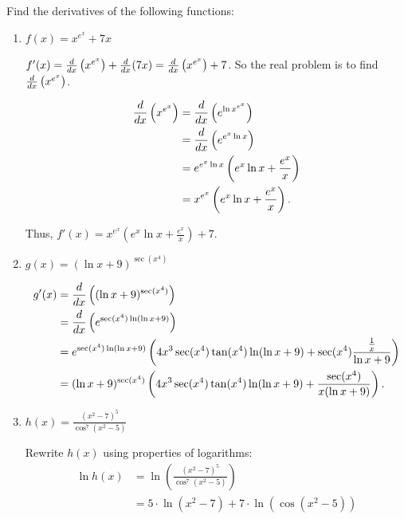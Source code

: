 \documentclass[nooutcomes]{ximera}
\begin{document}
\begin{problem}
Find the derivatives of the following functions:
	\begin{enumerate}
	
	\item  $f(x) = x^{e^x} + 7x$
		\begin{freeResponse}
		$f'(x) = \frac{d}{dx} \left(x^{e^x} \right) + \frac{d}{dx}(7x) = \frac{d}{dx} \left(x^{e^x} \right) + 7$.  So the real problem is to find $\frac{d}{dx} \left(x^{e^x} \right)$.  
		
		\begin{align*}
		\frac{d}{dx} \left( x^{e^x} \right) &= \frac{d}{dx} \left( e^{\ln x^{e^x}} \right) \\
		&= \frac{d}{dx} \left( e^{e^x \ln x} \right) \\
		&= e^{e^x \ln x} \left( e^x \ln x + \frac{e^x}{x} \right) \\
		&= x^{e^x} \left( e^x \ln x + \frac{e^x}{x} \right).
		\end{align*}
		
		Thus, $f'(x) = x^{e^x} \left( e^x \ln x + \frac{e^x}{x} \right) + 7$.  
		
		\end{freeResponse}

	\item  $g(x) = (\ln x + 9)^{\sec(x^4)}$
		\begin{freeResponse}
			\begin{align*}
			g'(x) &= \frac{d}{dx} \left( (\ln x + 9)^{\sec(x^4)} \right) \\
			&= \frac{d}{dx} \left( e^{\sec(x^4) \ln ( \ln x + 9) } \right) \\
			&= e^{\sec(x^4) \ln ( \ln x + 9)} \left( 4x^3 \sec(x^4) \tan(x^4) \ln(\ln x + 9) + \sec(x^4) \frac{\frac{1}{x}}{\ln x + 9} \right) \\
			&= (\ln x + 9)^{\sec(x^4)} \left( 4x^3 \sec(x^4) \tan(x^4) \ln(\ln x + 9) + \frac{\sec(x^4)}{x(\ln x + 9)} \right) .
			\end{align*}
		\end{freeResponse}
		
	\item  $h(x) = \frac{(x^2 - 7)^5}{\cos^7(x^2 - 5)}$
          \begin{freeResponse}
            Rewrite $h(x)$ using properties of logarithms:
            \begin{align*}
              \ln h(x) &= \ln \left( \frac{(x^2 - 7)^5}{\cos^7(x^2 - 5)}\right) \\
                       &= 5 \cdot \ln (x^2 - 7) + 7 \cdot \ln(\cos(x^2-5))
            \end{align*}


\end{freeResponse}
\end{enumerate}
\end{problem}
\end{document}
